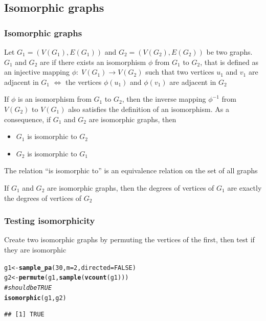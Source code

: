 \documentclass[aspectratio=169]{beamer}\usepackage[]{graphicx}\usepackage[]{xcolor}
\makeatletter
\newcommand{\hlnum}[1]{\textcolor[rgb]{0.686,0.059,0.569}{#1}}%
\newcommand{\hlcom}[1]{\textcolor[rgb]{0.678,0.584,0.686}{\textit{#1}}}%
\newcommand{\hldef}[1]{\textcolor[rgb]{0.345,0.345,0.345}{#1}}%
\newcommand{\hlkwb}[1]{\textcolor[rgb]{0.69,0.353,0.396}{#1}}%
\newcommand{\hlkwc}[1]{\textcolor[rgb]{0.333,0.667,0.333}{#1}}%
\newcommand{\hlkwd}[1]{\textcolor[rgb]{0.737,0.353,0.396}{\textbf{#1}}}%
\newenvironment{kframe}{%
 \def\at@end@of@kframe{}%
 \ifinner\ifhmode%
  \def\at@end@of@kframe{\end{minipage}}%
  \begin{minipage}{\columnwidth}%
 \fi\fi%
 \def\FrameCommand##1{\hskip\@totalleftmargin \hskip-\fboxsep
 \colorbox{shadecolor}{##1}\hskip-\fboxsep
     \hskip-\linewidth \hskip-\@totalleftmargin \hskip\columnwidth}%
 \MakeFramed {\advance\hsize-\width
   \@totalleftmargin\z@ \linewidth\hsize
   \@setminipage}}%
 {\par\unskip\endMakeFramed%
 \at@end@of@kframe}
\newenvironment{knitrout}{}{} %
\makeatother
\begin{document}
\subsection{Isomorphic graphs}

\begin{frame} \frametitle{Isomorphic graphs} 
\begin{definition}
Let $G_1=(V(G_1),E(G_1))$ and $G_2=(V(G_2),E(G_2))$ be two graphs.
$G_1$ and $G_2$ are  if there exists an isomorphism $\phi$ from $G_1$ to $G_2$, that is defined as an injective mapping $\phi:\; V(G_1) \rightarrow V(G_2)$ such that two vertices $u_1$ and $v_1$ are adjacent in $G_1$ $\iff$ the vertices $\phi(u_1)$ and $\phi(v_1)$ are adjacent in $G_2$
\end{definition}
\end{frame}
 
 
 
\begin{frame}
If $\phi$ is an isomorphism from $G_1$ to $G_2$, then the inverse mapping $\phi ^{-1}$ from $V(G_2)$ to $V(G_1)$ also satisfies the definition of an isomorphism.
As a consequence, if $G_1$ and $G_2$ are isomorphic graphs, then
\begin{itemize}
\item $G_1$ is isomorphic to $G_2$
\item $G_2$ is isomorphic to $G_1$
\end{itemize}
\vfill
\begin{theorem}
The relation ``is isomorphic to'' is an equivalence relation on the set of all graphs
\end{theorem}
\vfill
\begin{theorem}
If $G_1$ and $G_2$ are isomorphic graphs, then the degrees of vertices of $G_1$ are exactly the degrees of vertices of $G_2$
\end{theorem}
\end{frame}

\begin{frame}[fragile]\frametitle{Testing isomorphicity}
Create two isomorphic graphs by permuting the vertices of the first, then test if they are isomorphic
\vfill
\begin{knitrout}
\color{fgcolor}\begin{kframe}
\begin{alltt}
\hldef{g1} \hlkwb{<-} \hlkwd{sample_pa}\hldef{(}\hlnum{30}\hldef{,} \hlkwc{m} \hldef{=} \hlnum{2}\hldef{,} \hlkwc{directed} \hldef{=} \hlnum{FALSE}\hldef{)}
\hldef{g2} \hlkwb{<-} \hlkwd{permute}\hldef{(g1,} \hlkwd{sample}\hldef{(}\hlkwd{vcount}\hldef{(g1)))}
\hlcom{# should be TRUE}
\hlkwd{isomorphic}\hldef{(g1, g2)}
\end{alltt}
\begin{verbatim}
## [1] TRUE
\end{verbatim}
\end{kframe}
\end{knitrout}
\end{frame}
\end{document}
